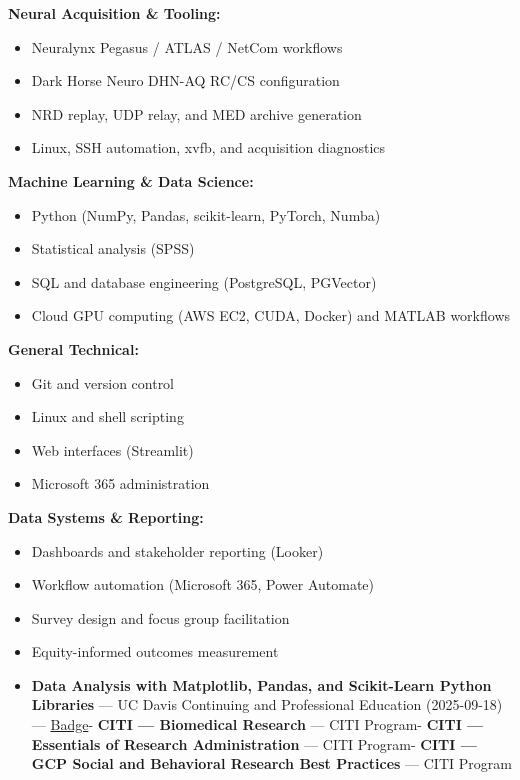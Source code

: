 \documentclass[11pt]{article}
\providecommand{\tightlist}{\setlength{\itemsep}{0pt}\setlength{\parskip}{0pt}}
\renewcommand{\subsection}[1]{\par\medskip\noindent{\sffamily\bfseries\fontsize{11pt}{0}\selectfont #1}\par\smallskip}
\begin{document}
\textbf{Neural Acquisition \& Tooling:}

\begin{itemize}
  \item Neuralynx Pegasus / ATLAS / NetCom workflows  \item Dark Horse Neuro DHN-AQ RC/CS configuration  \item NRD replay, UDP relay, and MED archive generation  \item Linux, SSH automation, xvfb, and acquisition diagnostics\end{itemize}

\textbf{Machine Learning \& Data Science:}

\begin{itemize}
  \item Python (NumPy, Pandas, scikit-learn, PyTorch, Numba)  \item Statistical analysis (SPSS)  \item SQL and database engineering (PostgreSQL, PGVector)  \item Cloud GPU computing (AWS EC2, CUDA, Docker) and MATLAB workflows\end{itemize}

\textbf{General Technical:}

\begin{itemize}
  \item Git and version control  \item Linux and shell scripting  \item Web interfaces (Streamlit)  \item Microsoft 365 administration\end{itemize}

\textbf{Data Systems \& Reporting:}

\begin{itemize}
  \item Dashboards and stakeholder reporting (Looker)  \item Workflow automation (Microsoft 365, Power Automate)  \item Survey design and focus group facilitation  \item Equity-informed outcomes measurement\end{itemize}

\subsection{Certifications}\label{certifications}

\begin{itemize}
\tightlist
\item
  \textbf{Data Analysis with Matplotlib, Pandas, and Scikit-Learn Python
  Libraries} --- UC Davis Continuing and Professional Education
  (2025-09-18) ---
  \href{https://www.credly.com/badges/505ef11c-58b4-48bd-aa9e-5a21f0247d46/public_url}{Badge}-
  \textbf{CITI --- Biomedical Research} --- CITI Program- \textbf{CITI
  --- Essentials of Research Administration} --- CITI Program-
  \textbf{CITI --- GCP Social and Behavioral Research Best Practices}
  --- CITI Program
\end{itemize}
\end{document}
